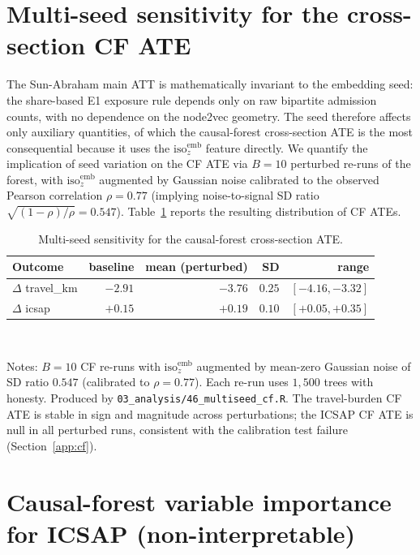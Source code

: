 \section{Multi-seed sensitivity for the cross-section CF ATE}
\label{app:cf-multiseed}

The Sun-Abraham main ATT is mathematically invariant to the embedding
seed: the share-based E1 exposure rule depends only on raw bipartite
admission counts, with no dependence on the node2vec geometry. The
seed therefore affects only auxiliary quantities, of which the
causal-forest cross-section ATE is the most consequential because
it uses the $\mathrm{iso}^{\mathrm{emb}}_z$ feature directly. We
quantify the implication of seed variation on the CF ATE via $B = 10$
perturbed re-runs of the forest, with $\mathrm{iso}^{\mathrm{emb}}_z$
augmented by Gaussian noise calibrated to the observed Pearson
correlation $\rho = 0.77$ (implying noise-to-signal SD ratio
$\sqrt{(1-\rho)/\rho} = 0.547$). Table~\ref{tab:cf-multiseed} reports
the resulting distribution of CF ATEs.

\begin{table}[h!]
\centering
\caption{Multi-seed sensitivity for the causal-forest cross-section ATE.}
\label{tab:cf-multiseed}
\begin{tabular}{lrrrr}
\toprule
Outcome & baseline & mean (perturbed) & SD & range \\
\midrule
$\Delta$ travel\_km & $-2.91$ & $-3.76$ & $0.25$ & $[-4.16, -3.32]$ \\
$\Delta$ icsap      & $+0.15$ & $+0.19$ & $0.10$ & $[+0.05, +0.35]$ \\
\bottomrule
\end{tabular}
\\[0.5em]
\begin{minipage}{0.95\textwidth}
\footnotesize Notes: $B = 10$ CF re-runs with
$\mathrm{iso}^{\mathrm{emb}}_z$ augmented by mean-zero Gaussian noise
of SD ratio $0.547$ (calibrated to $\rho = 0.77$). Each re-run uses
$1{,}500$ trees with honesty. Produced by
\texttt{03\_analysis/46\_multiseed\_cf.R}. The travel-burden CF ATE
is stable in sign and magnitude across perturbations; the ICSAP CF
ATE is null in all perturbed runs, consistent with the calibration
test failure (Section~\ref{app:cf}).
\end{minipage}
\end{table}

\section{Causal-forest variable importance for ICSAP (non-interpretable)}
\label{app:cf-icsap}

